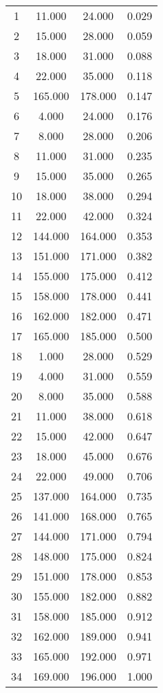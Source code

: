 % 
\begin{tabular}{cccc}
  \hline
  \hline
1 & 11.000 & 24.000 & 0.029 \\ 
  2 & 15.000 & 28.000 & 0.059 \\ 
  3 & 18.000 & 31.000 & 0.088 \\ 
  4 & 22.000 & 35.000 & 0.118 \\ 
  5 & 165.000 & 178.000 & 0.147 \\ 
  6 & 4.000 & 24.000 & 0.176 \\ 
  7 & 8.000 & 28.000 & 0.206 \\ 
  8 & 11.000 & 31.000 & 0.235 \\ 
  9 & 15.000 & 35.000 & 0.265 \\ 
  10 & 18.000 & 38.000 & 0.294 \\ 
  11 & 22.000 & 42.000 & 0.324 \\ 
  12 & 144.000 & 164.000 & 0.353 \\ 
  13 & 151.000 & 171.000 & 0.382 \\ 
  14 & 155.000 & 175.000 & 0.412 \\ 
  15 & 158.000 & 178.000 & 0.441 \\ 
  16 & 162.000 & 182.000 & 0.471 \\ 
  17 & 165.000 & 185.000 & 0.500 \\ 
  18 & 1.000 & 28.000 & 0.529 \\ 
  19 & 4.000 & 31.000 & 0.559 \\ 
  20 & 8.000 & 35.000 & 0.588 \\ 
  21 & 11.000 & 38.000 & 0.618 \\ 
  22 & 15.000 & 42.000 & 0.647 \\ 
  23 & 18.000 & 45.000 & 0.676 \\ 
  24 & 22.000 & 49.000 & 0.706 \\ 
  25 & 137.000 & 164.000 & 0.735 \\ 
  26 & 141.000 & 168.000 & 0.765 \\ 
  27 & 144.000 & 171.000 & 0.794 \\ 
  28 & 148.000 & 175.000 & 0.824 \\ 
  29 & 151.000 & 178.000 & 0.853 \\ 
  30 & 155.000 & 182.000 & 0.882 \\ 
  31 & 158.000 & 185.000 & 0.912 \\ 
  32 & 162.000 & 189.000 & 0.941 \\ 
  33 & 165.000 & 192.000 & 0.971 \\ 
  34 & 169.000 & 196.000 & 1.000 \\ 
   \hline
\end{tabular}
